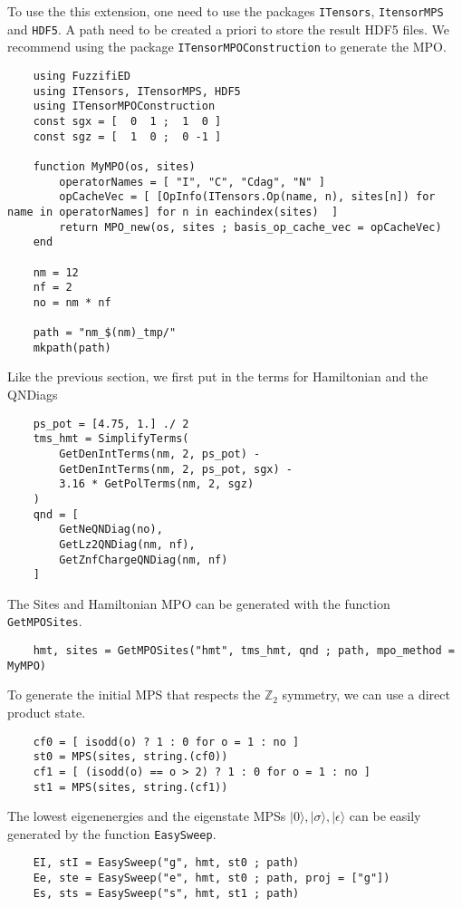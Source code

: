 \documentclass{timesjhep}
\begin{document}
To use the this extension, one need to use the packages \lstinline|ITensors|, \lstinline|ItensorMPS| and \lstinline|HDF5|. A path need to be created a priori to store the result HDF5 files. We recommend using the package \lstinline|ITensorMPOConstruction| to generate the MPO. 
\begin{lstlisting}
    using FuzzifiED
    using ITensors, ITensorMPS, HDF5
    using ITensorMPOConstruction
    const sgx = [  0  1 ;  1  0 ]
    const sgz = [  1  0 ;  0 -1 ]

    function MyMPO(os, sites)
        operatorNames = [ "I", "C", "Cdag", "N" ]
        opCacheVec = [ [OpInfo(ITensors.Op(name, n), sites[n]) for name in operatorNames] for n in eachindex(sites)  ]
        return MPO_new(os, sites ; basis_op_cache_vec = opCacheVec)
    end

    nm = 12
    nf = 2
    no = nm * nf

    path = "nm_$(nm)_tmp/"
    mkpath(path)
\end{lstlisting}
Like the previous section, we first put in the terms for Hamiltonian and the QNDiags 
\begin{lstlisting}
    ps_pot = [4.75, 1.] ./ 2
    tms_hmt = SimplifyTerms(
        GetDenIntTerms(nm, 2, ps_pot) - 
        GetDenIntTerms(nm, 2, ps_pot, sgx) - 
        3.16 * GetPolTerms(nm, 2, sgz)
    )
    qnd = [ 
        GetNeQNDiag(no), 
        GetLz2QNDiag(nm, nf), 
        GetZnfChargeQNDiag(nm, nf) 
    ]
\end{lstlisting}
The Sites and Hamiltonian MPO can be generated with the function \lstinline|GetMPOSites|. 
\begin{lstlisting}
    hmt, sites = GetMPOSites("hmt", tms_hmt, qnd ; path, mpo_method = MyMPO)
\end{lstlisting}
To generate the initial MPS that respects the $\mathbb{Z}_2$ symmetry, we can use a direct product state. 
\begin{lstlisting}
    cf0 = [ isodd(o) ? 1 : 0 for o = 1 : no ]
    st0 = MPS(sites, string.(cf0))
    cf1 = [ (isodd(o) == o > 2) ? 1 : 0 for o = 1 : no ]
    st1 = MPS(sites, string.(cf1))
\end{lstlisting}
The lowest eigenenergies and the eigenstate MPSs $|0\rangle,|\sigma\rangle,|\epsilon\rangle$ can be easily generated by the function \lstinline|EasySweep|.
\begin{lstlisting}
    EI, stI = EasySweep("g", hmt, st0 ; path)
    Ee, ste = EasySweep("e", hmt, st0 ; path, proj = ["g"])
    Es, sts = EasySweep("s", hmt, st1 ; path)
\end{lstlisting}
\end{document}
